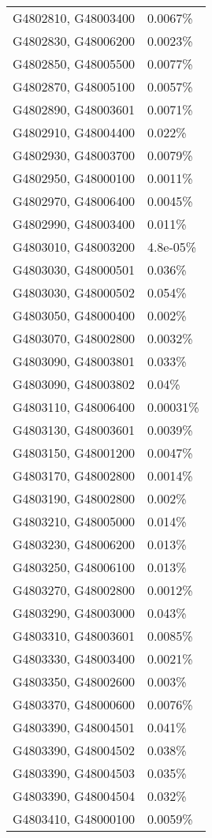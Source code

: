 \begin{longtable}[]{@{}ll@{}}
G4802810, G48003400 & 0.0067\% \\
G4802830, G48006200 & 0.0023\% \\
G4802850, G48005500 & 0.0077\% \\
G4802870, G48005100 & 0.0057\% \\
G4802890, G48003601 & 0.0071\% \\
G4802910, G48004400 & 0.022\% \\
G4802930, G48003700 & 0.0079\% \\
G4802950, G48000100 & 0.0011\% \\
G4802970, G48006400 & 0.0045\% \\
G4802990, G48003400 & 0.011\% \\
G4803010, G48003200 & 4.8e-05\% \\
G4803030, G48000501 & 0.036\% \\
G4803030, G48000502 & 0.054\% \\
G4803050, G48000400 & 0.002\% \\
G4803070, G48002800 & 0.0032\% \\
G4803090, G48003801 & 0.033\% \\
G4803090, G48003802 & 0.04\% \\
G4803110, G48006400 & 0.00031\% \\
G4803130, G48003601 & 0.0039\% \\
G4803150, G48001200 & 0.0047\% \\
G4803170, G48002800 & 0.0014\% \\
G4803190, G48002800 & 0.002\% \\
G4803210, G48005000 & 0.014\% \\
G4803230, G48006200 & 0.013\% \\
G4803250, G48006100 & 0.013\% \\
G4803270, G48002800 & 0.0012\% \\
G4803290, G48003000 & 0.043\% \\
G4803310, G48003601 & 0.0085\% \\
G4803330, G48003400 & 0.0021\% \\
G4803350, G48002600 & 0.003\% \\
G4803370, G48000600 & 0.0076\% \\
G4803390, G48004501 & 0.041\% \\
G4803390, G48004502 & 0.038\% \\
G4803390, G48004503 & 0.035\% \\
G4803390, G48004504 & 0.032\% \\
G4803410, G48000100 & 0.0059\% \\

\end{longtable}

